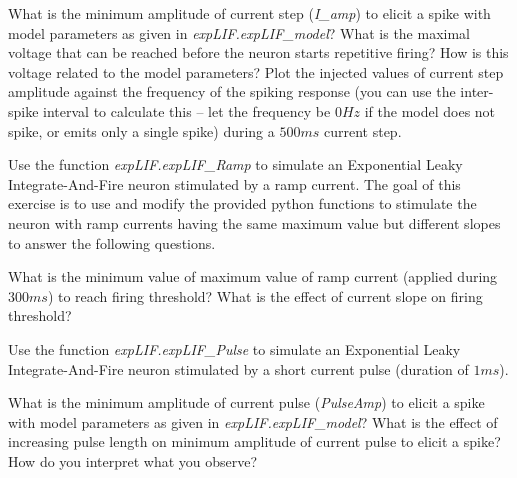 \documentclass[a4paper,10pt]{Exercises}
\begin{document}
\Question What is the minimum amplitude of current step (\emph{I\_amp}) to elicit a spike with model parameters as given in \emph{expLIF.expLIF\_model}?
\Question What is the maximal voltage that can be reached before the neuron starts repetitive firing? How is this voltage related to the model parameters?
\Question Plot the injected values of current step amplitude against the frequency of the spiking response (you can use the inter-spike interval to calculate this -- let the frequency be $0Hz$ if the model does not spike, or emits only a single spike) during a $500ms$ current step.


\Exercise[]

Use the function \emph{expLIF.expLIF\_Ramp} to simulate an Exponential Leaky Integrate-And-Fire neuron stimulated by a ramp current. The goal of this exercise is to use and modify the provided python functions to stimulate the neuron with ramp currents having the same maximum value  but different slopes to answer the following questions.

\Question  What is the minimum value of maximum value of ramp current (applied during $300ms$) to reach firing threshold?
\Question What is the effect of current slope on firing threshold?

\Exercise[]

Use the function \emph{expLIF.expLIF\_Pulse} to simulate an Exponential Leaky Integrate-And-Fire neuron stimulated by a short current pulse (duration of $1ms$).


\Question What is the minimum  amplitude of current pulse (\emph{PulseAmp}) to elicit a spike with model parameters as given in \emph{expLIF.expLIF\_model}?
\Question What is the effect of increasing pulse length on minimum amplitude of current pulse to elicit a spike? How do you interpret what you observe?



\end{document}
